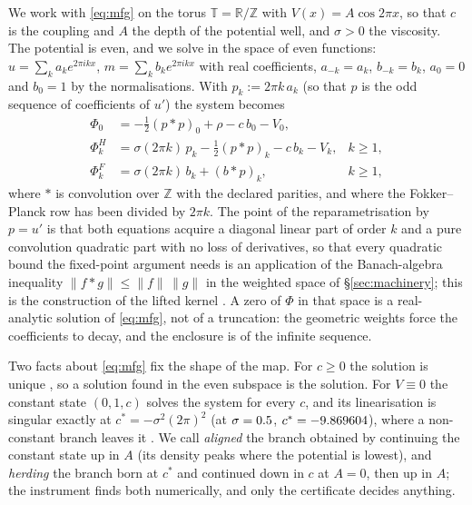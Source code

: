 \documentclass[11pt]{article}
\theoremstyle{definition}
\newcommand{\cstar}{c^{*}}
\begin{document}
We work with \eqref{eq:mfg} on the torus $\mathbb{T}=\mathbb{R}/\mathbb{Z}$ with $V(x)=A\cos2\pi x$, so that $c$ is the coupling and $A$ the depth of the potential well, and $\sigma>0$ the viscosity. The potential is even, and we solve in the space of even functions: $u=\sum_k a_k e^{2\pi i k x}$, $m=\sum_k b_k e^{2\pi ikx}$ with real coefficients, $a_{-k}=a_k$, $b_{-k}=b_k$, $a_0=0$ and $b_0=1$ by the normalisations. With $p_k:=2\pi k\,a_k$ (so that $p$ is the odd sequence of coefficients of $u'$) the system becomes
\begin{equation}\label{eq:fourier}
\begin{aligned}
\Phi_0 &= -\tfrac12 (p*p)_0 + \rho - c\,b_0 - V_0,\\
\Phi^H_k &= \sigma(2\pi k)\,p_k - \tfrac12 (p*p)_k - c\,b_k - V_k, & k\ge1,\\
\Phi^F_k &= \sigma(2\pi k)\,b_k + (b*p)_k, & k\ge1,
\end{aligned}
\end{equation}
where $*$ is convolution over $\mathbb{Z}$ with the declared parities, and where the Fokker--Planck row has been divided by $2\pi k$. The point of the reparametrisation by $p=u'$ is that both equations acquire a diagonal linear part of order $k$ and a pure convolution quadratic part with no loss of derivatives, so that every quadratic bound the fixed-point argument needs is an application of the Banach-algebra inequality $\|f*g\|\le\|f\|\,\|g\|$ in the weighted space of \S\ref{sec:machinery}; this is the construction of the lifted kernel \cite{CapPage}. A zero of $\Phi$ in that space is a real-analytic solution of \eqref{eq:mfg}, not of a truncation: the geometric weights force the coefficients to decay, and the enclosure is of the infinite sequence.

Two facts about \eqref{eq:mfg} fix the shape of the map. For $c\ge0$ the solution is unique \cite{LL07}, so a solution found in the even subspace is the solution. For $V\equiv0$ the constant state $(0,1,c)$ solves the system for every $c$, and its linearisation is singular exactly at $\cstar=-\sigma^2(2\pi)^2$ (at $\sigma=0.5$, $\cstar=\OneCStarSix$), where a non-constant branch leaves it \cite{CapPage}. We call \emph{aligned} the branch obtained by continuing the constant state up in $A$ (its density peaks where the potential is lowest), and \emph{herding} the branch born at $\cstar$ and continued down in $c$ at $A=0$, then up in $A$; the instrument finds both numerically, and only the certificate decides anything.
\end{document}
